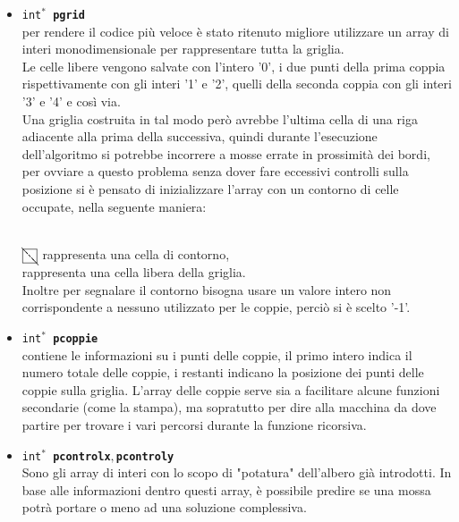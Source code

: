 \documentclass[11pt,a4paper,twocolumn]{IEEEtran}
\newcommand{\mysvg}[2]{}
\newcounter{algoritmo}
\begin{document}
	\begin{itemize}
		\item \texttt{int$^*$ \textbf{pgrid}}\\per rendere il codice più veloce è stato ritenuto migliore utilizzare un array di interi monodimensionale per rappresentare tutta la griglia.\\
		Le celle libere vengono salvate con l'intero '0', i due punti della prima coppia rispettivamente con gli interi '1' e '2', quelli della seconda coppia con gli interi '3' e '4' e così via.\\
		Una griglia costruita in tal modo però avrebbe l'ultima cella di una riga adiacente alla prima della successiva, quindi durante l'esecuzione dell'algoritmo si potrebbe incorrere a mosse errate in prossimità dei bordi, per ovviare a questo problema senza dover fare eccessivi controlli sulla posizione si è pensato di inizializzare l'array con un contorno di celle occupate, nella seguente maniera:
		\begin{figure}[h]
			\centering
			\qquad\qquad\quad\text{ }
			\mysvg{pgrid1}{35}
		\end{figure}
	\vspace*{-1.7cm}
			\begin{figure}[h]
		\centering
		\qquad\text{ }
		\mysvg{Downarrow}{03}
	\end{figure}
	\vspace*{-0.9cm}
		\begin{figure}[h]
	\centering
	\text{ }\hspace*{0.6cm}
	\mysvg{pgrid2}{6}
\end{figure}\\

	\(\bcancel{\fbox{\color{white}a}}\) rappresenta una cella di contorno,\\ {} rappresenta una cella libera della griglia.\medskip\\
	Inoltre per segnalare il contorno bisogna usare un valore intero non corrispondente a nessuno utilizzato per le coppie, perciò si è scelto '-1'.\\
	
	\item \texttt{int$^*$ \textbf{pcoppie}}\\ contiene le informazioni su i punti delle coppie, il primo intero indica il numero totale delle coppie, i restanti indicano la posizione dei punti delle coppie sulla griglia. L'array delle coppie serve sia a facilitare alcune funzioni secondarie (come la stampa), ma sopratutto per dire alla macchina da dove partire per trovare i vari percorsi durante la funzione ricorsiva.\\
	
	\item \texttt{int$^*$ \textbf{pcontrolx}$,$\space\textbf{pcontroly}}\\
	Sono gli array di interi con lo scopo di "potatura" dell'albero già introdotti. In base alle informazioni dentro questi array, è possibile predire se una mossa potrà portare o meno ad una soluzione complessiva.\\
	\end{itemize}
\end{document}
